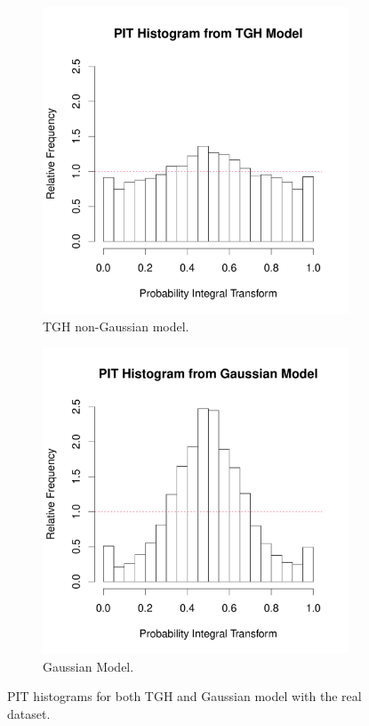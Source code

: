 \documentclass[conference]{IEEEtran}
\begin{document}
\begin{figure}[h]
\centering
\begin{subfigure}{.26\textwidth}
  \centering
  \includegraphics[width=\linewidth]{./figures/PIT_real_nongaussian.pdf}
   \caption{TGH non-Gaussian model.}
\end{subfigure}%
\begin{subfigure}{.26\textwidth}
  \centering
  \includegraphics[width=\linewidth]{./figures/PIT_real_Gaussian.pdf}
  \caption{Gaussian Model.}
\end{subfigure}
  \caption{PIT histograms for both TGH and Gaussian model with the real dataset. }
  \label{fig:PIT_real}
\end{figure}
\end{document}
